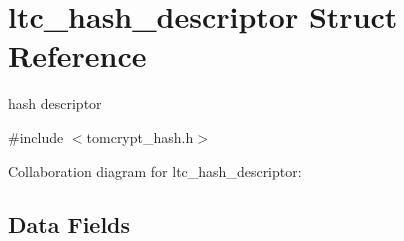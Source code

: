 \hypertarget{structltc__hash__descriptor}{}\section{ltc\+\_\+hash\+\_\+descriptor Struct Reference}
\label{structltc__hash__descriptor}


hash descriptor  




{\ttfamily \#include $<$tomcrypt\+\_\+hash.\+h$>$}



Collaboration diagram for ltc\+\_\+hash\+\_\+descriptor\+:
\subsection*{Data Fields}
